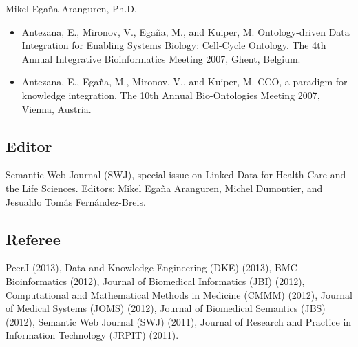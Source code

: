 \documentclass[english,11pt,a4paper,oneside]{article}
\begin{document}
\begin{cv}{Mikel Ega\~na Aranguren, Ph.D. }
\begin{itemize}
\item Antezana, E., Mironov, V., Ega\~na, M., and Kuiper, M. Ontology-driven Data Integration for Enabling Systems Biology: Cell-Cycle Ontology. The 4th Annual Integrative Bioinformatics Meeting 2007, Ghent, Belgium.

\item Antezana, E., Ega\~na, M., Mironov, V., and Kuiper, M. CCO, a paradigm for knowledge integration. The 10th Annual Bio-Ontologies Meeting 2007, Vienna, Austria.
\end{itemize}


\subsection*{Editor}
	Semantic Web Journal (SWJ), special issue on Linked Data for Health Care and the Life Sciences. 
	Editors: Mikel Ega\~na Aranguren, Michel Dumontier, and Jesualdo Tom\'as Fern\'andez-Breis. 


\subsection*{Referee}
PeerJ (2013),
Data and Knowledge Engineering (DKE) (2013),
BMC Bioinformatics (2012),
Journal of Biomedical Informatics (JBI) (2012),
Computational and Mathematical Methods in Medicine (CMMM) (2012),
Journal of Medical Systems (JOMS) (2012),
Journal of Biomedical Semantics (JBS) (2012),
Semantic Web Journal (SWJ) (2011),
Journal of Research and Practice in Information Technology (JRPIT) (2011).


\end{cv}
\end{document}
